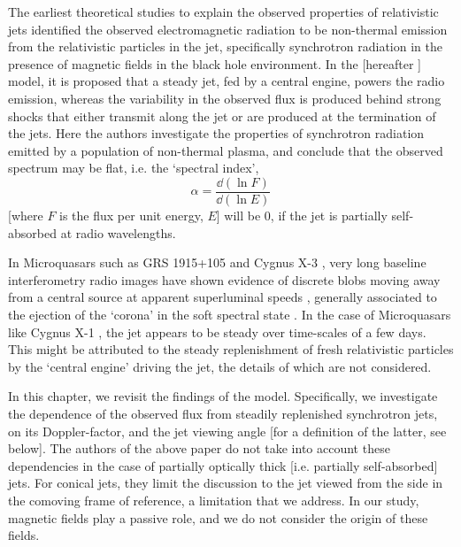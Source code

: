 The earliest theoretical studies to explain the observed properties of relativistic jets \citep{Blandford_&_Rees-1974-MNRAS, Blandford_&_McKee-1976, Blandford_&_McKee-1977-MNRAS, Blandford_&_Konigl-1979-ApJ, Lind_&_Blandford-1985-ApJ} identified the observed electromagnetic radiation to be non-thermal emission from the relativistic particles in the jet, specifically synchrotron radiation in the presence of magnetic fields in the black hole environment. In the \cite{Blandford_&_Konigl-1979-ApJ} [hereafter ] model, it is proposed that a steady jet, fed by a central engine, powers the radio emission, whereas the variability in the observed flux is produced behind strong shocks that either transmit along the jet or are produced at the termination of the jets. Here the authors investigate the properties of synchrotron radiation emitted by a population of non-thermal plasma, and conclude that the observed spectrum may be flat, i.e. the `spectral index',
\begin{equation}
\alpha = \frac{\dd (\ln F)}{\dd (\ln E)}
\end{equation} [where $ F $ is the flux per unit energy, $E$] will be $0$, if the jet is partially self-absorbed at radio wavelengths.

In Microquasars such as GRS 1915+105 \citep{Fender_et_al.-1999-MNRAS} and Cygnus X-3 \citep{Miller-Jones_et_al.-2004-ApJ}, very long baseline interferometry radio images have shown evidence of discrete blobs moving away from a central source at apparent superluminal speeds \citep{Dhawan_et_al.-2000-ApJ}, generally associated to the ejection of the `corona' in the soft spectral state \citep{Fender_et_al.-2004-MNRAS}. In the case of Microquasars like Cygnus X-1 \citep{Russell_&_Shahbaz-2014-MNRAS}, the jet appears to be steady over time-scales of a few days. This might be attributed to the steady replenishment of fresh relativistic particles by the `central engine' driving the jet, the details of which are not considered.

In this chapter, we revisit the findings of the  model. Specifically, we investigate the dependence of the observed flux from steadily replenished synchrotron jets, on its Doppler-factor, and the jet viewing angle [for a definition of the latter, see below]. The authors of the above paper do not take into account these dependencies in the case of partially optically thick [i.e. partially self-absorbed] jets. For conical jets, they limit the discussion to the jet viewed from the side in the comoving frame of reference, a limitation that we address. In our study, magnetic fields play a passive role, and we do not consider the origin of these fields.

